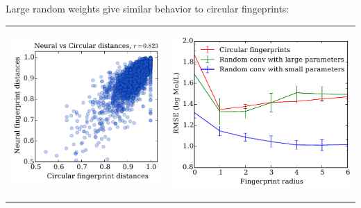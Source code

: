 \documentclass[landscape,a0b,final,a4resizeable]{include/a0poster}
\begin{document}
\begin{poster}
\begin{multicols}{3}
\vspace{0.5em}




\newpage %



Large random weights give similar behavior to circular fingeprints:
\vspace{0.5em}

\begin{tabular}{cc}
\begin{minipage}[c]{0.48\columnwidth}
\includegraphics[width=\columnwidth]{figures/fig_2.pdf}
\end{minipage} & 
\begin{minipage}[c]{0.48\columnwidth}
\begin{center}
\vspace{0.5cm}\includegraphics[width=\columnwidth]{figures/fig_3.pdf}

\end{center}
\end{minipage}
\end{tabular}
\end{multicols}
\end{poster}
\end{document}
